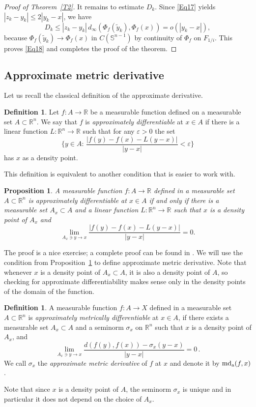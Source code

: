 \documentclass[12pt,leqno]{amsart}
\newtheorem{proposition}[theorem]{Proposition}
\theoremstyle{definition}
\newtheorem{definition}[theorem]{Definition}
\newcommand{\bbbr}{\mathbb R}
\newcommand{\Sph}{\mathbb S}
\newcommand{\eps}{\varepsilon}
\def\apmd{\operatorname{md_{\rm a}}}
\numberwithin{theorem}{section} \numberwithin{equation}{section}
\begin{document}
\begin{proof}[Proof of Theorem~\ref{T2}]
It remains to estimate $D_k$. Since \eqref{Eq17} yields $|z_k-y_k|\leq 2|y_k-x|$, we have
$$
D_k\leq |z_k-y_k|\,d_\infty(\Phi_f(\tilde{y}_k),\Phi_f(x))=o(|y_k-x|),
$$
because $\Phi_f(\tilde{y}_k)\to\Phi_f(x)$ in $C(\Sph^{n-1})$ by continuity of $\Phi_f$ on $F_{1/i}$.
This proves \eqref{Eq18} and completes the proof of the theorem.
\end{proof}



\subsection{Approximate metric derivative}
\label{AD1}

Let us recall the classical definition of the approximate derivative.
\begin{definition}
Let $f:A\to\bbbr$ be a measurable function defined on a measurable set $A\subset\bbbr^n$. We say that
$f$ is {\em approximately differentiable} at $x\in A$ if there is a linear function $L:\bbbr^n\to\bbbr$
such that for any $\eps>0$ the set
$$
\Big\{ y\in A:\, \frac{|f(y)-f(x)-L(y-x)|}{|y-x|} <\eps \Big\}
$$
has $x$ as a density point.
\end{definition}
This definition is equivalent to another condition that is easier to work with.
\begin{proposition}
\label{ADT1}
A measurable function $f:A\to\bbbr$ defined in a measurable set $A\subset\bbbr^n$ is approximately
differentiable at $x\in A$ if and only if there is a measurable set $A_x\subset A$
and a linear function $L:\bbbr^n\to\bbbr$ such that $x$ is a density point of $A_x$  and
$$
\lim_{A_x\ni y\to x} \frac{|f(y)-f(x)-L(y-x)|}{|y-x|} = 0.
$$
\end{proposition}
The proof is a nice exercise; a complete proof can be found in \cite[Proposition~5.2]{GH2}. We will use the condition from Proposition~\ref{ADT1} to define approximate metric derivative. Note that whenever $x$ is a density point of $A_x\subset A$, it is also a density point of $A$, so checking for approximate differentiability makes sense only in the density points of the domain of the function.
\begin{definition}
\label{def1}
A measurable function $f:A\to X$ defined in a measurable set $A\subset\bbbr^n$
is {\em approximately metrically differentiable} at $x\in A$, if there exists a measurable set $A_x \subset A$ and a seminorm $\sigma_x$ on $\bbbr^n$ such that $x$ is a density point of $A_x$, and
\begin{equation}
\label{eq34}
    \lim_{A_x \ni y\to x} \frac{d(f(y),f(x)) - \sigma_x(y-x)}{|y-x|} = 0 \, .
\end{equation}
We call $\sigma_x$ the \emph{approximate metric derivative} of $f$ at $x$ and denote it by $\apmd(f,x)$.
\end{definition}
Note that since $x$ is a density point of $A$, the seminorm $\sigma_x$ is unique and in particular it does not depend on the choice of $A_x$.
\end{document}
